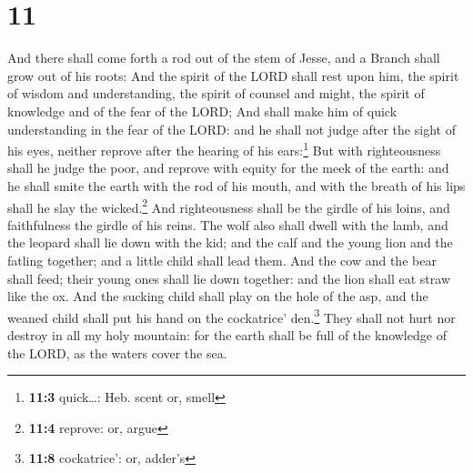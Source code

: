 \hypertarget{section-10}{%
\section{11}\label{section-10}}

 And there shall come forth a rod out of the stem of
Jesse, and a Branch shall grow out of his roots:  And the
spirit of the LORD shall rest upon him, the spirit of wisdom and
understanding, the spirit of counsel and might, the spirit of knowledge
and of the fear of the LORD;  And shall make him of quick
understanding in the fear of the LORD: and he shall not judge after the
sight of his eyes, neither reprove after the hearing of his
ears:\footnote{\textbf{11:3} quick\ldots: Heb. scent or, smell}
 But with righteousness shall he judge the poor, and
reprove with equity for the meek of the earth: and he shall smite the
earth with the rod of his mouth, and with the breath of his lips shall
he slay the wicked.\footnote{\textbf{11:4} reprove: or, argue}
 And righteousness shall be the girdle of his loins, and
faithfulness the girdle of his reins.  The wolf also shall
dwell with the lamb, and the leopard shall lie down with the kid; and
the calf and the young lion and the fatling together; and a little child
shall lead them.  And the cow and the bear shall feed;
their young ones shall lie down together: and the lion shall eat straw
like the ox.  And the sucking child shall play on the hole
of the asp, and the weaned child shall put his hand on the cockatrice'
den.\footnote{\textbf{11:8} cockatrice': or, adder's} 
They shall not hurt nor destroy in all my holy mountain: for the earth
shall be full of the knowledge of the LORD, as the waters cover the sea.

